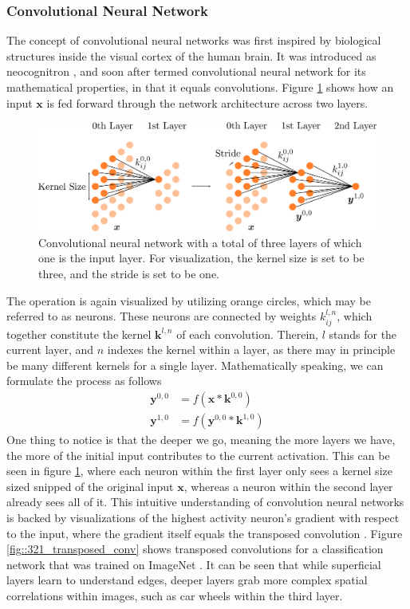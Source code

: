 \subsubsection{Convolutional Neural Network}
The concept of convolutional neural networks was first inspired by biological structures inside the visual cortex of the human brain. It was introduced as neocognitron \cite{fukushima1980neocognitron}, and soon after termed convolutional neural network for its mathematical properties, in that it equals convolutions. Figure \ref{fig::321_convolutional} shows how an input $\bm{x}$ is fed forward through the network architecture across two layers.   
\begin{figure}[h]
	\centering
	\includegraphics[scale=.28]{chapters/03_background/img/convolutional.png}
	\caption{Convolutional neural network with a total of three layers of which one is the input layer. For visualization, the kernel size is set to be three, and the stride is set to be one.}
	\label{fig::321_convolutional}
\end{figure}
The operation is again visualized by utilizing orange circles, which may be referred to as neurons. These neurons are connected by weights $k^{l,n}_{ij}$, which together constitute the kernel $\bm{k}^{l,n}$ of each convolution. Therein, $l$ stands for the current layer, and $n$ indexes the kernel within a layer, as there may in principle be many different kernels for a single layer. Mathematically speaking, we can formulate the process as follows
\begin{align}
	\bm{y}^{0,0} &= f(\bm{x}*\bm{k}^{0,0}) \\
	\bm{y}^{1,0} &= f(\bm{y}^{0,0}*\bm{k}^{1,0})	
\end{align}
One thing to notice is that the deeper we go, meaning the more layers we have, the more of the initial input contributes to the current activation. This can be seen in figure \ref{fig::321_convolutional}, where each neuron within the first layer only sees a kernel size sized snipped of the original input $\bm{x}$, whereas a neuron within the second layer already sees all of it. This intuitive understanding of convolution neural networks is backed by visualizations of the highest activity neuron's gradient with respect to the input, where the gradient itself equals the transposed convolution \cite{simonyan2013deep}.  Figure \ref{fig::321_transposed_conv} shows transposed convolutions for a classification network that was trained on ImageNet \cite{deng2009imagenet}. It can be seen that while superficial layers learn to understand edges, deeper layers grab more complex spatial correlations within images, such as car wheels within the third layer.
